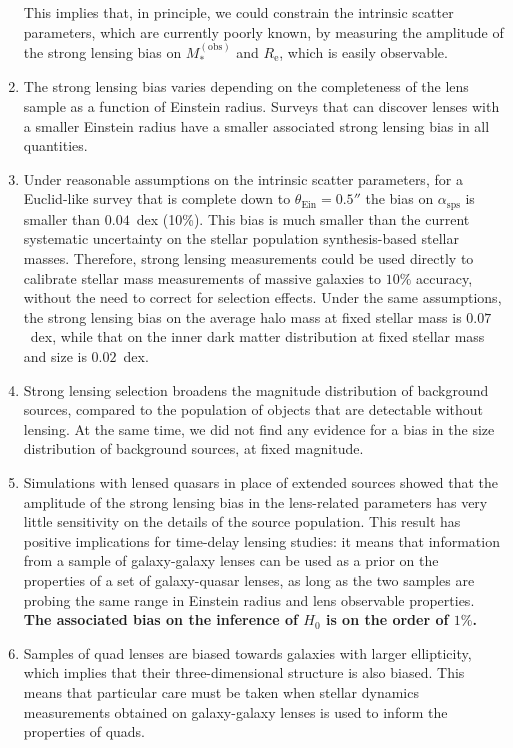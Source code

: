 \documentclass{aa}
\def\reff{R_{\mathrm{e}}}
\def\asps{\alpha_{\mathrm{sps}}}
\def\mobs{M_*^{(\mathrm{obs})}}
\def\tein{\theta_{\mathrm{Ein}}}
\begin{document}
\begin{enumerate}
This implies that, in principle, we could constrain the intrinsic scatter parameters, which are currently poorly known, by measuring the amplitude of the strong lensing bias on $\mobs$ and $\reff$, which is easily observable.
\item The strong lensing bias varies depending on the completeness of the lens sample as a function of Einstein radius. Surveys that can discover lenses with a smaller Einstein radius have a smaller associated strong lensing bias in all quantities.
\item 
Under reasonable assumptions on the intrinsic scatter parameters, for a Euclid-like survey that is complete down to $\tein=0.5''$ the bias on $\asps$ is smaller than $0.04$~dex (10\%). This bias is much smaller than the current systematic uncertainty on the stellar population synthesis-based stellar masses. Therefore, strong lensing measurements could be used directly to calibrate stellar mass measurements of massive galaxies to $10\%$ accuracy, without the need to correct for selection effects.
Under the same assumptions, the strong lensing bias on the average halo mass at fixed stellar mass is $0.07$~dex, while that on the inner dark matter distribution at fixed stellar mass and size is $0.02$~dex.
%
\item Strong lensing selection broadens the magnitude distribution of background sources, compared to the population of objects that are detectable without lensing.
At the same time, we did not find any evidence for a bias in the size distribution of background sources, at fixed magnitude.

\item Simulations with lensed quasars in place of extended sources showed that the amplitude of the strong lensing bias in the lens-related parameters has very little sensitivity on the details of the source population.
This result has positive implications for time-delay lensing studies: it means that information from a sample of galaxy-galaxy lenses can be used as a prior on the properties of a set of galaxy-quasar lenses, as long as the two samples are probing the same range in Einstein radius and lens observable properties.
{\bf
The associated bias on the inference of $H_0$ is on the order of $1\%$.
}
\item Samples of quad lenses are biased towards galaxies with larger ellipticity, which implies that their three-dimensional structure is also biased. This means that particular care must be taken when stellar dynamics measurements obtained on galaxy-galaxy lenses is used to inform the properties of quads.
\end{enumerate}
\end{document}
